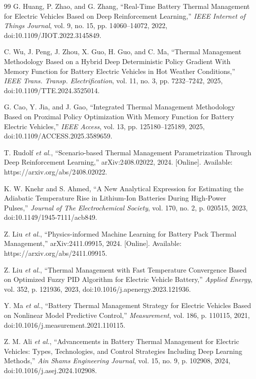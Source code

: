 \documentclass{article}
\begin{document}
\begin{thebibliography}{99}
G. Huang, P. Zhao, and G. Zhang, ``Real-Time Battery Thermal Management for Electric Vehicles Based on Deep Reinforcement Learning,'' \textit{IEEE Internet of Things Journal}, vol. 9, no. 15, pp. 14060--14072, 2022, doi:10.1109/JIOT.2022.3145849.

C. Wu, J. Peng, J. Zhou, X. Guo, H. Guo, and C. Ma, ``Thermal Management Methodology Based on a Hybrid Deep Deterministic Policy Gradient With Memory Function for Battery Electric Vehicles in Hot Weather Conditions,'' \textit{IEEE Trans. Transp. Electrification}, vol. 11, no. 3, pp. 7232--7242, 2025, doi:10.1109/TTE.2024.3525014.

G. Cao, Y. Jia, and J. Gao, ``Integrated Thermal Management Methodology Based on Proximal Policy Optimization With Memory Function for Battery Electric Vehicles,'' \textit{IEEE Access}, vol. 13, pp. 125180--125189, 2025, doi:10.1109/ACCESS.2025.3589659.

T. Rudolf \textit{et al.}, ``Scenario-based Thermal Management Parametrization Through Deep Reinforcement Learning,'' arXiv:2408.02022, 2024. [Online]. Available: https://arxiv.org/abs/2408.02022.

K. W. Knehr and S. Ahmed, ``A New Analytical Expression for Estimating the Adiabatic Temperature Rise in Lithium-Ion Batteries During High-Power Pulses,'' \textit{Journal of The Electrochemical Society}, vol. 170, no. 2, p. 020515, 2023, doi:10.1149/1945-7111/acb849.

Z. Liu \textit{et al.}, ``Physics-informed Machine Learning for Battery Pack Thermal Management,'' arXiv:2411.09915, 2024. [Online]. Available: https://arxiv.org/abs/2411.09915.

Z. Liu \textit{et al.}, ``Thermal Management with Fast Temperature Convergence Based on Optimized Fuzzy PID Algorithm for Electric Vehicle Battery,'' \textit{Applied Energy}, vol. 352, p. 121936, 2023, doi:10.1016/j.apenergy.2023.121936.

Y. Ma \textit{et al.}, ``Battery Thermal Management Strategy for Electric Vehicles Based on Nonlinear Model Predictive Control,'' \textit{Measurement}, vol. 186, p. 110115, 2021, doi:10.1016/j.measurement.2021.110115.

Z. M. Ali \textit{et al.}, ``Advancements in Battery Thermal Management for Electric Vehicles: Types, Technologies, and Control Strategies Including Deep Learning Methods,'' \textit{Ain Shams Engineering Journal}, vol. 15, no. 9, p. 102908, 2024, doi:10.1016/j.asej.2024.102908.


\end{thebibliography}
\end{document}
